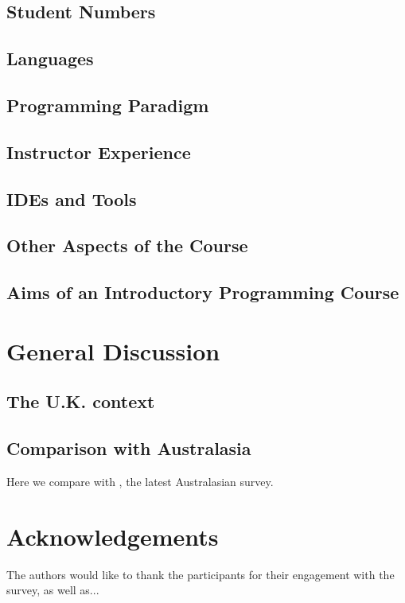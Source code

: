 \documentclass{sig-alternate}
\begin{document}
\subsection{Student Numbers}

\subsection{Languages}

\subsection{Programming Paradigm}

\subsection{Instructor Experience}

\subsection{IDEs and Tools}

\subsection{Other Aspects of the Course}

\subsection{Aims of an Introductory Programming Course}


\section{General Discussion}\label{discussion}

\subsection{The U.K. context}

\subsection{Comparison with Australasia}
Here we compare with \cite{mason+cooper:2014}, the latest Australasian survey.


\section{Acknowledgements}

The authors would like to thank the participants for their engagement
with the survey, as well as...



\end{document}
